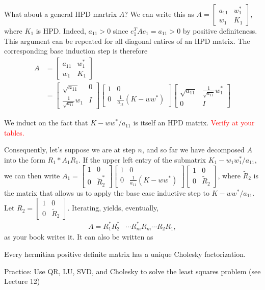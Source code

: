 \documentclass{ximera}
\begin{document}
What about a general HPD martrix $A$?  We can write this as $A = \begin{bmatrix}a_{11} & w_1^* \\ w_1 & K_1\end{bmatrix}$, where $K_1$ is HPD.  Indeed, $a_{11} > 0$ since $e_1^TAe_1 = a_{11} > 0$ by positive definiteness.  This argument can be repeated for all diagonal entires of an HPD matrix.  The corresponding base induction step is therefore
\begin{align*}
    A &= \begin{bmatrix}
        a_{11} & w_1^* \\ w_1 & K_1
    \end{bmatrix} 
    \\
    &=
    \begin{bmatrix}
        \sqrt{a_{11}}& 0 \\ \frac{1}{\sqrt{a_{11}}}w_1 & I
    \end{bmatrix}
    \begin{bmatrix}
        1 & 0 \\ 0 & \frac{1}{a_{11}}(K-ww^*)
    \end{bmatrix}
    \begin{bmatrix}
        \sqrt{a_{11}}& \frac{1}{\sqrt{a_{11}}}w_1^*  \\ 0& I
    \end{bmatrix}
\end{align*}

We induct on the fact that $K - ww^*/{a_11}$ is itself an HPD matrix.  \textcolor{red}{Verify at your tables.}

Consequently, let's suppose we are at step $n$, and so far we have decomposed $A$ into the form 
$R_1*A_1R_1$.  If the upper left entry of the submatrix $K_1 - w_1w_1^*/a_{11}$, we can then write  $A_1 = \begin{bmatrix}1 & 0 \\ 0 & \tilde{R}_2^*\end{bmatrix}\begin{bmatrix}
        1 & 0 \\ 0 & \frac{1}{a_{11}}(K-ww^*)
    \end{bmatrix} \begin{bmatrix} 1 & 0 \\0 & \tilde{R}_2 \end{bmatrix}$,
    where $\tilde{R}_2$ is the matrix that allows us to apply the base case inductive step to $K- ww^*/a_{11}$.  Let $R_2 = \begin{bmatrix} 1 & 0 \\0 & \tilde{R}_2 \end{bmatrix}$.  Iterating, yields, eventually, 
    \begin{align*}
        A = R_1^*R_2^*& \cdots R_m^* R_m \cdots R_2R_1,
    \end{align*}
    as your book writes it.  It can also be written as 

\begin{theorem}
    Every hermitian positive definite matrix has a unique Cholesky factorization. 
\end{theorem}

Practice: Use QR, LU, SVD, and Cholesky to solve the least squares problem (see Lecture 12)
\end{document}
